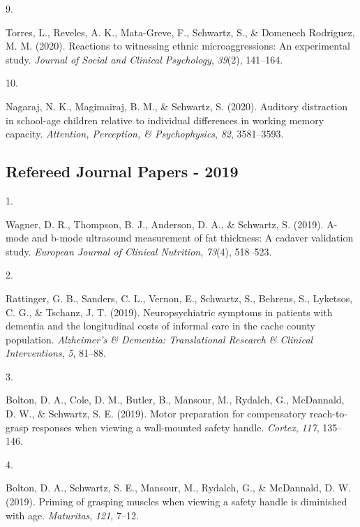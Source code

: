 \documentclass[11pt,a4paper,]{moderncv}
\newlength{\csllabelwidth}
\newcommand{\CSLLeftMargin}[1]{\parbox[t]{\csllabelwidth}{#1}}
\newcommand{\CSLRightInline}[1]{\parbox[t]{\linewidth - \csllabelwidth}{#1}}
\begin{document}
\leavevmode{}%
\CSLLeftMargin{9. }
\CSLRightInline{Torres, L., Reveles, A. K., Mata-Greve, F., Schwartz,
S., \& Domenech Rodriguez, M. M. (2020). Reactions to witnessing ethnic
microaggressions: An experimental study. \emph{Journal of Social and
Clinical Psychology}, \emph{39}(2), 141--164.}

\leavevmode{}%
\CSLLeftMargin{10. }
\CSLRightInline{Nagaraj, N. K., Magimairaj, B. M., \& Schwartz, S.
(2020). Auditory distraction in school-age children relative to
individual differences in working memory capacity. \emph{Attention,
Perception, \& Psychophysics}, \emph{82}, 3581--3593.}

\vspace{7mm}

\hypertarget{refereed-journal-papers---2019}{%
\subsection{\texorpdfstring{\textbf{Refereed Journal Papers -
2019}}{Refereed Journal Papers - 2019}}\label{refereed-journal-papers---2019}}

\hypertarget{refs_journals2019}{}
\leavevmode{}%
\CSLLeftMargin{1. }
\CSLRightInline{Wagner, D. R., Thompson, B. J., Anderson, D. A., \&
Schwartz, S. (2019). A-mode and b-mode ultrasound measurement of fat
thickness: A cadaver validation study. \emph{European Journal of
Clinical Nutrition}, \emph{73}(4), 518--523.}

\leavevmode{}%
\CSLLeftMargin{2. }
\CSLRightInline{Rattinger, G. B., Sanders, C. L., Vernon, E., Schwartz,
S., Behrens, S., Lyketsos, C. G., \& Tschanz, J. T. (2019).
Neuropsychiatric symptoms in patients with dementia and the longitudinal
costs of informal care in the cache county population. \emph{Alzheimer's
\& Dementia: Translational Research \& Clinical Interventions},
\emph{5}, 81--88.}

\leavevmode{}%
\CSLLeftMargin{3. }
\CSLRightInline{Bolton, D. A., Cole, D. M., Butler, B., Mansour, M.,
Rydalch, G., McDannald, D. W., \& Schwartz, S. E. (2019). Motor
preparation for compensatory reach-to-grasp responses when viewing a
wall-mounted safety handle. \emph{Cortex}, \emph{117}, 135--146.}

\leavevmode{}%
\CSLLeftMargin{4. }
\CSLRightInline{Bolton, D. A., Schwartz, S. E., Mansour, M., Rydalch,
G., \& McDannald, D. W. (2019). Priming of grasping muscles when viewing
a safety handle is diminished with age. \emph{Maturitas}, \emph{121},
7--12.}
\end{document}
